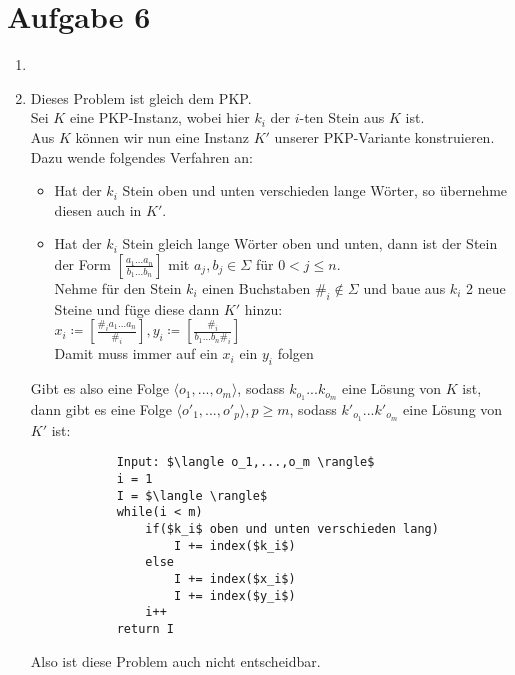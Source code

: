 \documentclass[a4paper,11pt]{scrartcl}
\begin{document}
\newpage
	\section*{Aufgabe 6}
	\begin{enumerate}[label=\alph*)]
	\item	
			
	\item	Dieses Problem ist gleich dem PKP.\\
			Sei $K$ eine PKP-Instanz, wobei hier $k_i$ der $i$-ten Stein aus $K$ ist.\\
			Aus $K$ können wir nun eine Instanz $K'$ unserer PKP-Variante konstruieren. Dazu wende folgendes Verfahren an:
			\begin{itemize}
			\item Hat der $k_i$ Stein oben und unten verschieden lange Wörter, so übernehme diesen auch in $K'$.
			\item Hat der $k_i$ Stein gleich lange Wörter oben und unten, dann ist der Stein der Form $\left[ \frac{a_1...a_n}{b_1...b_n} \right]$ mit $a_j, b_j \in \Sigma$ für $0<j\leq n$.\\
				  Nehme für den Stein $k_i$ einen Buchstaben $\#_i \not\in\Sigma$ und baue aus $k_i$ 2 neue Steine und füge diese dann $K'$ hinzu:\\
				  $x_i\coloneqq \left[ \frac{\#_ia_1...a_n}{\#_i} \right], y_i\coloneqq \left[ \frac{\#_i}{b_1...b_n\#_i} \right]$\\
				  Damit muss immer auf ein $x_i$ ein $y_i$ folgen
			\end{itemize}
			Gibt es also eine Folge $\langle o_1,...,o_m \rangle$, sodass $k_{o_1} ... k_{o_m}$ eine Lösung von $K$ ist, dann gibt es eine Folge $\langle o'_1,...,o'_p \rangle , p \geq m$, sodass $k'_{o_1} ... k'_{o_m}$ eine Lösung von $K'$ ist:
			\begin{lstlisting}
			Input: $\langle o_1,...,o_m \rangle$
			i = 1
			I = $\langle \rangle$
			while(i < m)
				if($k_i$ oben und unten verschieden lang)
					I += index($k_i$)
				else
					I += index($x_i$)
					I += index($y_i$)
				i++
			return I
			\end{lstlisting}
			Also ist diese Problem auch nicht entscheidbar.
	\end{enumerate}
	
\end{document}
